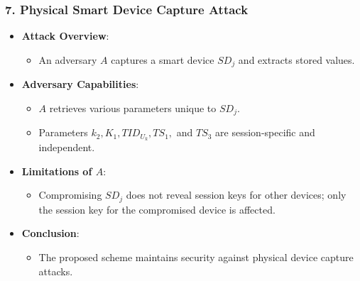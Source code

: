 \documentclass[9pt,handout]{beamer}
\begin{document}
\begin{frame}
    \frametitle{7. Physical Smart Device Capture Attack}
    \begin{itemize}
        \item \textbf{Attack Overview}:
            \begin{itemize}
                \item An adversary \( A \) captures a smart device \( SD_j \) and extracts stored values.
            \end{itemize}
        \item \textbf{Adversary Capabilities}:
            \begin{itemize}
                \item \( A \) retrieves various parameters unique to \( SD_j \).
                \item Parameters \( k_2, K_1, TID_{U_k}, TS_1, \) and \( TS_3 \) are session-specific and independent.
            \end{itemize}
        \item \textbf{Limitations of \( A \)}:
            \begin{itemize}
                \item Compromising \( SD_j \) does not reveal session keys for other devices; only the session key for the compromised device is affected.
            \end{itemize}
        \item \textbf{Conclusion}:
            \begin{itemize}
                \item The proposed scheme maintains security against physical device capture attacks.
            \end{itemize}
    \end{itemize}
\end{frame}
\end{document}
